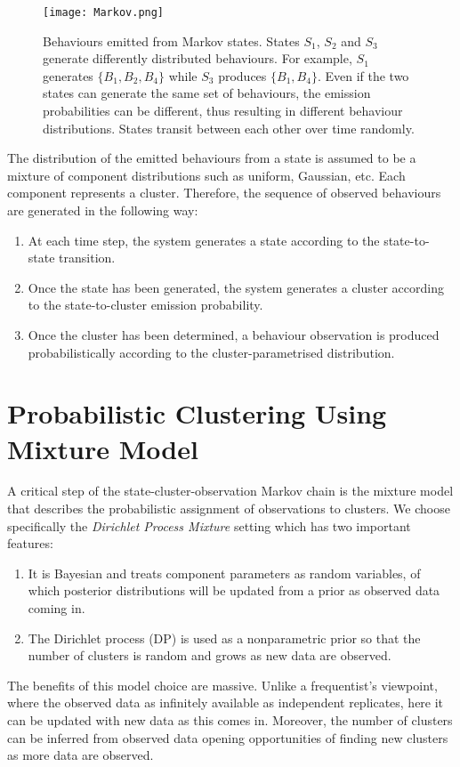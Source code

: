\documentclass[english,a4,oneside,9pt]{extarticle}
\begin{document}
\begin{figure}[htb]
\centering
\texttt{[image: Markov.png]}
\caption{Behaviours emitted from Markov states. States $S_1$, $S_2$ and $S_3$ generate differently distributed behaviours. For example, $S_1$ generates $\{B_1, B_2, B_4\}$ while $S_3$ produces $\{ B_1, B_4\}$.
Even if the two states can generate the same set of behaviours, the emission probabilities can be different, thus resulting in different behaviour distributions. States transit between each other over time randomly.}
\label{fig:markov}
\end{figure}

The distribution of the emitted behaviours from a state is assumed to be a mixture of component distributions such as uniform, Gaussian, etc. Each component represents a cluster. Therefore, the sequence of observed behaviours are generated in the following way:
\vspace*{-2mm}
\begin{enumerate}
\item At each time step, the system generates a state according to the state-to-state transition.
\vspace*{-1mm}
\item Once the state has been generated, the system generates a cluster according to the state-to-cluster emission probability.
\vspace*{-1mm}
\item Once the cluster has been determined, a behaviour observation is produced probabilistically according to the cluster-parametrised distribution.
\end{enumerate}

\section{Probabilistic Clustering Using Mixture Model}


A critical step of the state-cluster-observation Markov chain is the mixture model that describes the probabilistic assignment of observations to clusters. We choose specifically the \textit{Dirichlet Process Mixture} setting which has two important features:
\begin{enumerate}
\item It is Bayesian and treats component parameters as random variables, of which posterior distributions will be updated from a prior as observed data coming in. 
\item The Dirichlet process (DP) is used as a nonparametric prior so that the number of clusters is random and grows as new data are observed.
\end{enumerate}
The benefits of this model choice are massive. Unlike a frequentist's viewpoint, where the observed data as infinitely available as independent replicates, here it can be updated with new data as this comes in. Moreover, the number of clusters can be inferred from observed data opening opportunities of finding new clusters as more data are observed.
\end{document}
